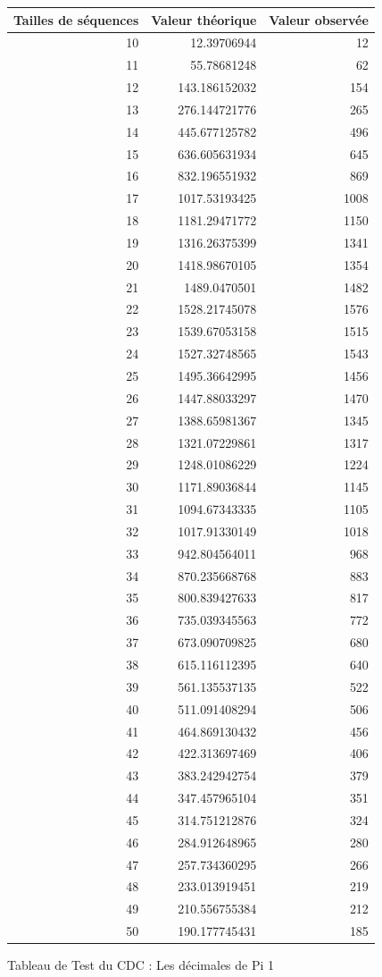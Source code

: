 \documentclass[french]{article}
\begin{document}
\begin{figure}[h!]
	\centering
	\begin{tabular}{|r|r|r|}
		\hline
		Tailles de séquences & Valeur théorique & Valeur observée\\
		\hline
		10 & 12.39706944 & 12\\
		11 & 55.78681248 & 62\\
		12 & 143.186152032 & 154\\
		13 & 276.144721776 & 265\\
		14 & 445.677125782 & 496\\
		15 & 636.605631934 & 645\\
		16 & 832.196551932 & 869\\
		17 & 1017.53193425 & 1008\\
		18 & 1181.29471772 & 1150\\
		19 & 1316.26375399 & 1341\\
		20 & 1418.98670105 & 1354\\
		21 & 1489.0470501 & 1482\\
		22 & 1528.21745078 & 1576\\
		23 & 1539.67053158 & 1515\\
		24 & 1527.32748565 & 1543\\
		25 & 1495.36642995 & 1456\\
		26 & 1447.88033297 & 1470\\
		27 & 1388.65981367 & 1345\\
		28 & 1321.07229861 & 1317\\
		29 & 1248.01086229 & 1224\\
		30 & 1171.89036844 & 1145\\
		31 & 1094.67343335 & 1105\\
		32 & 1017.91330149 & 1018\\
		33 & 942.804564011 & 968\\
		34 & 870.235668768 & 883\\
		35 & 800.839427633 & 817\\
		36 & 735.039345563 & 772\\
		37 & 673.090709825 & 680\\
		38 & 615.116112395 & 640\\
		39 & 561.135537135 & 522\\
		40 & 511.091408294 & 506\\
		41 & 464.869130432 & 456\\
		42 & 422.313697469 & 406\\
		43 & 383.242942754 & 379\\
		44 & 347.457965104 & 351\\
		45 & 314.751212876 & 324\\
		46 & 284.912648965 & 280\\
		47 & 257.734360295 & 266\\
		48 & 233.013919451 & 219\\
		49 & 210.556755384 & 212\\
		50 & 190.177745431 & 185\\
		\hline
	\end{tabular}
	\caption{Tableau de Test du CDC : Les décimales de Pi 1}
\end{figure}
\end{document}
